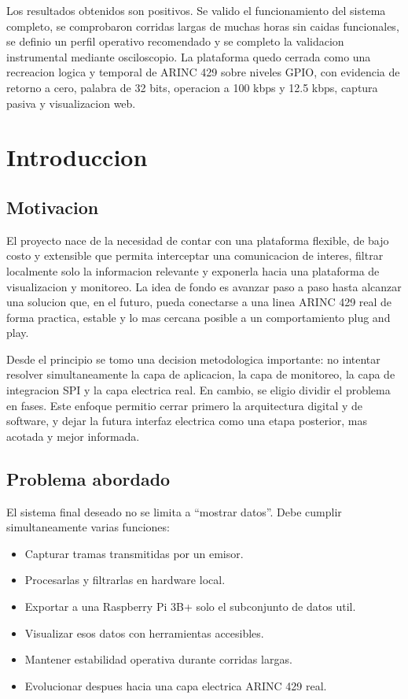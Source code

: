 \documentclass[12pt,a4paper,oneside]{report}
\begin{document}
Los resultados obtenidos son positivos. Se valido el funcionamiento del sistema completo, se comprobaron corridas largas de muchas horas sin caidas funcionales, se definio un perfil operativo recomendado y se completo la validacion instrumental mediante osciloscopio. La plataforma quedo cerrada como una recreacion logica y temporal de ARINC 429 sobre niveles GPIO, con evidencia de retorno a cero, palabra de 32 bits, operacion a 100 kbps y 12.5 kbps, captura pasiva y visualizacion web.

\chapter{Introduccion}

\section{Motivacion}

El proyecto nace de la necesidad de contar con una plataforma flexible, de bajo costo y extensible que permita interceptar una comunicacion de interes, filtrar localmente solo la informacion relevante y exponerla hacia una plataforma de visualizacion y monitoreo. La idea de fondo es avanzar paso a paso hasta alcanzar una solucion que, en el futuro, pueda conectarse a una linea ARINC 429 real de forma practica, estable y lo mas cercana posible a un comportamiento plug and play.

Desde el principio se tomo una decision metodologica importante: no intentar resolver simultaneamente la capa de aplicacion, la capa de monitoreo, la capa de integracion SPI y la capa electrica real. En cambio, se eligio dividir el problema en fases. Este enfoque permitio cerrar primero la arquitectura digital y de software, y dejar la futura interfaz electrica como una etapa posterior, mas acotada y mejor informada.

\section{Problema abordado}

El sistema final deseado no se limita a ``mostrar datos''. Debe cumplir simultaneamente varias funciones:

\begin{itemize}[leftmargin=1.2cm]
    \item Capturar tramas transmitidas por un emisor.
    \item Procesarlas y filtrarlas en hardware local.
    \item Exportar a una Raspberry Pi 3B+ solo el subconjunto de datos util.
    \item Visualizar esos datos con herramientas accesibles.
    \item Mantener estabilidad operativa durante corridas largas.
    \item Evolucionar despues hacia una capa electrica ARINC 429 real.
\end{itemize}
\end{document}
